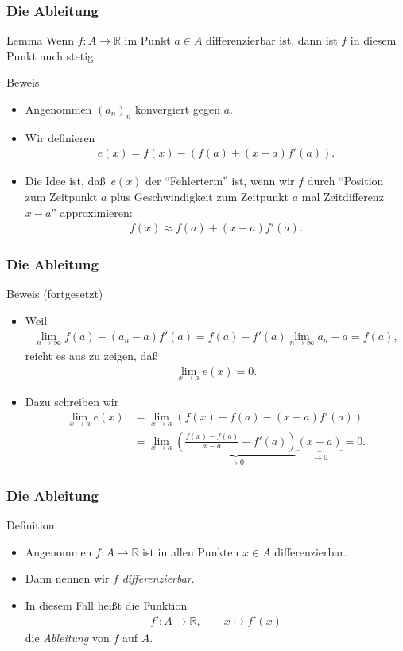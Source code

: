 \documentclass{beamer}
\renewcommand{\emph}[1]{{\textcolor{solarizedRed}{\itshape #1}}}
\newcommand\RR{\mathbb R}
\newcommand\bc[1]{\left({#1}\right)}
\newcommand{\mytitle}{Die Ableitung}
\begin{document}
\begin{frame}\frametitle{\mytitle}
	\begin{block}{Lemma}
		Wenn $f:A\to\RR$ im Punkt $a\in A$ differenzierbar ist, dann ist $f$ in diesem Punkt auch stetig.
	\end{block}
	\begin{block}{Beweis}
	\begin{itemize}
		\item Angenommen $(a_n)_n$ konvergiert gegen $a$.
		\item Wir definieren
			\begin{align*}
				e(x)=f(x)-\bc{f(a)+(x-a)f'(a)}.
			\end{align*}
		\item Die Idee ist, da\ss\ $e(x)$ der ``Fehlerterm'' ist, wenn wir $f$ durch ``Position zum Zeitpunkt $a$ plus Geschwindigkeit zum Zeitpunkt $a$ mal Zeitdifferenz $x-a$'' approximieren:
			\begin{align*}
				f(x)\approx f(a)+(x-a)f'(a).
			\end{align*}
	\end{itemize}
	\end{block}
\end{frame}

\begin{frame}\frametitle{\mytitle}
	\begin{block}{Beweis (fortgesetzt)}
	\begin{itemize}
		\item Weil
			\begin{align*}
				\lim_{n\to\infty}f(a)-(a_n-a)f'(a)=f(a)-f'(a)\lim_{n\to\infty}a_n-a=f(a),
			\end{align*}
			reicht es aus zu zeigen, da\ss
			\begin{align*}
				\lim_{x\to a}e(x)=0.
			\end{align*}
		\item Dazu schreiben wir
			\begin{align*}
				\lim_{x\to a}e(x)&=\lim_{x\to a}\bc{f(x)-f(a)-(x-a)f'(a)}\\
								 &=\lim_{x\to a}\underbrace{\bc{\frac{f(x)-f(a)}{x-a}-f'(a)}}_{\to 0}\underbrace{(x-a)}_{\to 0}=0.
			\end{align*}
	\end{itemize}
	\end{block}
\end{frame}

\begin{frame}\frametitle{\mytitle}
	\begin{block}{Definition}
	\begin{itemize}
		\item Angenommen $f:A\to\RR$ ist in allen Punkten $x\in A$ differenzierbar.
		\item Dann nennen wir $f$ \emph{differenzierbar}.
		\item In diesem Fall hei\ss t die Funktion
			\begin{align*}
				f':A\to\RR,\qquad x\mapsto f'(x)
			\end{align*}
			die \emph{Ableitung} von $f$ auf $A$.
	\end{itemize}
	\end{block}
\end{frame}
\end{document}
